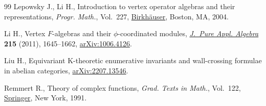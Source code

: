 \begin{thebibliography}{99}
Lepowsky J., Li H., Introduction to vertex operator algebras and their
 representations, \textit{Progr. Math.}, Vol.~227,
 \href{https://doi.org/10.1007/978-0-8176-8186-9}{Birkh\"auser}, Boston, MA,
 2004.

Li H., Vertex {$F$}-algebras and their {$\phi$}-coordinated modules,
 \href{https://doi.org/10.1016/j.jpaa.2010.10.001}{\textit{J.~Pure Appl.
 Algebra}} \textbf{215} (2011), 1645--1662,
 \href{http://arxiv.org/abs/1006.4126}{arXiv:1006.4126}.

Liu H., Equivariant {K}-theoretic enumerative invariants and wall-crossing
 formulae in abelian categories,
 \href{http://arxiv.org/abs/2207.13546}{arXiv:2207.13546}.

Remmert R., Theory of complex functions, \textit{Grad. Texts in Math.}, Vol.~122, \href{https://doi.org/10.1007/978-1-4612-0939-3}{Springer}, New York, 1991.

\end{thebibliography}

